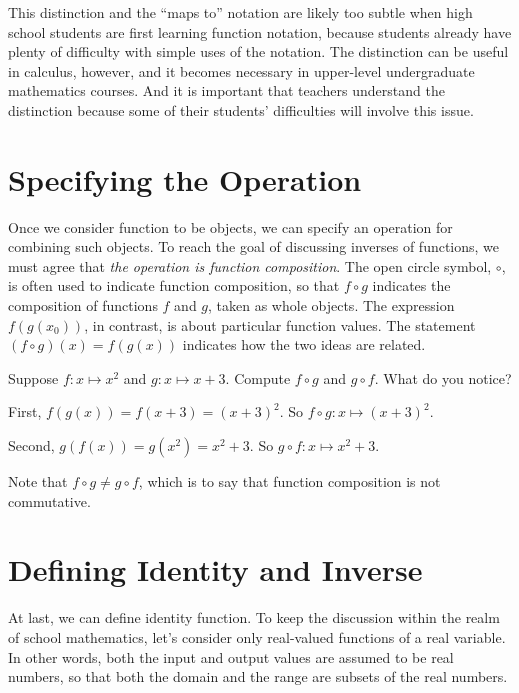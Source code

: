 \documentclass[space,handout,nooutcomes]{ximera}
\begin{document}
This distinction and the ``maps to'' notation are likely too subtle when high school students are first learning function notation, because students already have plenty of difficulty with simple uses of the notation.  The distinction can be useful in calculus, however, and it becomes necessary in upper-level undergraduate mathematics courses.  And it is important that teachers understand the distinction because some of their students' difficulties will involve this issue.


\section*{Specifying the Operation}
Once we consider function to be objects, we can specify an operation for combining such objects.  To reach the goal of discussing inverses of functions, we must agree that \emph{the operation is function composition}.  The open circle symbol, $\circ$, is often used to indicate function composition, so that $f\circ g$  indicates the composition of functions $f$ and $g$, taken as whole objects.  The expression $f(g(x_0))$, in contrast, is about particular function values.  The statement $(f\circ g)(x) = f(g(x))$ indicates how the two ideas are related.  

\begin{question}
Suppose $f: x\mapsto x^2$ and $g: x\mapsto x+3$.  Compute $f\circ g$ and $g\circ f$.  What do you notice?  
\begin{freeResponse}
\begin{hint}
First, $f(g(x))=f(x+3)=(x+3)^2$.  So $f\circ g: x\mapsto (x+3)^2$. 

Second, $g(f(x))=g(x^2)=x^2+3$.  So $g\circ f: x\mapsto x^2+3$. 

Note that $f\circ g \neq g\circ f$, which is to say that function composition is not commutative.  
\end{hint}
\end{freeResponse}
\end{question}

\section*{Defining Identity and Inverse}
At last, we can define identity function.  To keep the discussion within the realm of school mathematics, let's consider only real-valued functions of a real variable.  In other words, both the input and output values are assumed to be real numbers, so that both the domain and the range are subsets of the real numbers.  
\end{document}
